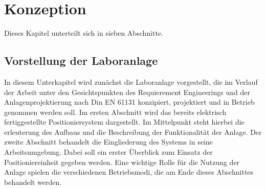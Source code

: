 \documentclass[../Bachelorarbeit.tex]{subfiles}
\begin{document}
\section{Konzeption}
Dieses Kapitel unterteilt sich in sieben Abschnitte.

\subsection{Vorstellung der Laboranlage}
In diesem Unterkapitel wird zunächst die Laboranlage vorgestellt, die im Verlauf der Arbeit unter den Gesichtspunkten des Requierement Engineerings und der Anlagenprojektierung nach Din EN 61131 konzipiert, projektiert und in Betrieb genommen werden soll. Im ersten Abschnitt wird das bereits elektrisch fertiggestellte Positioniersystem dargestellt. Im Mittelpunkt steht hierbei die erleuterung des Aufbaus und die Beschreibung der Funktionalität der Anlage. Der zweite Abschnitt behandelt die Eingliederung des Systems in seine Arbeitsumgebung. Dabei soll ein erster Überblick zum Einsatz der Positioniereinheit gegeben werden. Eine wichtige Rolle für die Nutzung der Anlage spielen die verschiedenen Betriebsmodi, die am Ende dieses Abschnittes behandelt werden.
\end{document}

